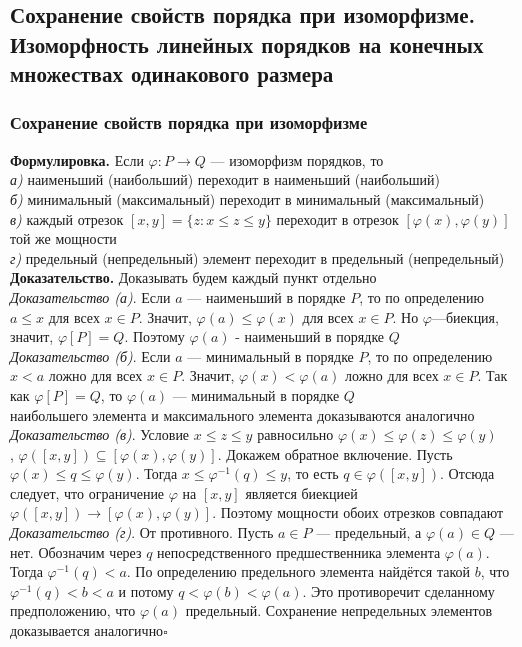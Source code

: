 \documentclass[a4paper]{article}
\newcommand{\qed}{\hfill$\square$}
\begin{document}
\subsection{Сохранение свойств порядка при изоморфизме. Изоморфность линейных порядков на конечных множествах одинакового размера}
\subsubsection*{Сохранение свойств порядка при изоморфизме}
\textbf{Формулировка.} Если $\varphi:P\to Q$ — изоморфизм порядков, то\\[2mm]
\indent\indent\textit{а)} наименьший (наибольший) переходит в наименьший (наибольший)\\[2mm]
\indent\indent\textit{б)} минимальный (максимальный) переходит в минимальный (максимальный)\\[2mm]
\indent\indent\textit{в)} каждый отрезок $[x,y]=\{z:x\leqslant z\leqslant y\}$ переходит в отрезок $[\varphi(x),\varphi(y)]$ той же мощности\\[2mm]
\indent\indent\textit{г)} предельный (непредельный) элемент переходит в предельный (непредельный)\\[2mm]
\indent\textbf{Доказательство.} Доказывать будем каждый пункт отдельно\\[2mm]
\textit{Доказательство (а)}. Если $a$ — наименьший в порядке $P$, то по определению $a \leqslant x$ для всех $x \in P$. Значит, $\varphi(a) \leqslant \varphi(x)$ для всех $x \in P$. Но $\varphi$—биекция, значит, $\varphi[P]=Q$. Поэтому $\varphi(a)$ - наименьший в порядке $Q$\\[2mm]
\textit{Доказательство (б)}. Если $a$ — минимальный в порядке $P$, то по определению $x<a$ ложно для всех $x \in P$. Значит, $\varphi(x)<\varphi(a)$ ложно для всех $x \in P$. Так как $\varphi[P]=Q$, то $\varphi(a)$ — минимальный в порядке $Q$\\[2mm]
 наибольшего элемента и максимального элемента доказываются аналогично\\[2mm]
\textit{Доказательство (в)}. Условие $x \leqslant z \leqslant y$ равносильно $\varphi(x) \leqslant \varphi(z) \leqslant \varphi(y)$\\
, $\varphi([x, y]) \subseteq[\varphi(x), \varphi(y)]$. Докажем обратное включение. Пусть $\varphi(x) \leqslant q \leqslant \varphi(y)$. Тогда $x \leqslant \varphi^{-1}(q) \leqslant y$, то есть $q \in \varphi([x, y])$. Отсюда следует, что ограничение $\varphi$ на $[x, y]$ является биекцией $\varphi([x, y]) \rightarrow[\varphi(x), \varphi(y)]$. Поэтому мощности обоих отрезков совпадают\\[2mm]
\textit{Доказательство (г)}. От противного. Пусть $a \in P$ — предельный, а $\varphi(a) \in Q$ — нет. Обозначим через $q$ непосредственного предшественника элемента $\varphi(a)$. Тогда $\varphi^{-1}(q)<a$. По определению предельного элемента найдётся такой $b$, что $\varphi^{-1}(q)<b<a$ и потому $q<\varphi(b)<\varphi(a)$. Это противоречит сделанному предположению, что $\varphi(a)$ предельный. Сохранение непредельных элементов доказывается аналогично\qed
\end{document}
